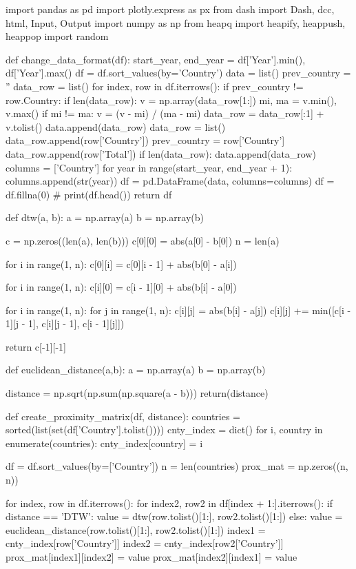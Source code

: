 import pandas as pd
import plotly.express as px
from dash import Dash, dcc, html, Input, Output
import numpy as np
from heapq import heapify, heappush, heappop
import random


def change_data_format(df):
    start_year, end_year = df['Year'].min(), df['Year'].max()
    df = df.sort_values(by='Country')
    data = list()
    prev_country = ''
    data_row = list()
    for index, row in df.iterrows():
        if prev_country != row.Country:
            if len(data_row):
                v = np.array(data_row[1:])
                mi, ma = v.min(), v.max()
                if mi != ma:
                    v = (v - mi) / (ma - mi)
                data_row = data_row[:1] + v.tolist()
                data.append(data_row)
            data_row = list()
            data_row.append(row['Country'])
            prev_country = row['Country']
        data_row.append(row['Total'])
    if len(data_row):
        data.append(data_row)
    columns = ['Country']
    for year in range(start_year, end_year + 1):
        columns.append(str(year))
    df = pd.DataFrame(data, columns=columns)
    df = df.fillna(0)
    # print(df.head())
    return df


def dtw(a, b):
    a = np.array(a)
    b = np.array(b)

    c = np.zeros((len(a), len(b)))
    c[0][0] = abs(a[0] - b[0])
    n = len(a)

    for i in range(1, n):
        c[0][i] = c[0][i - 1] + abs(b[0] - a[i])

    for i in range(1, n):
        c[i][0] = c[i - 1][0] + abs(b[i] - a[0])

    for i in range(1, n):
        for j in range(1, n):
            c[i][j] = abs(b[i] - a[j])
            c[i][j] += min([c[i - 1][j - 1], c[i][j - 1], c[i - 1][j]])

    return c[-1][-1]


def euclidean_distance(a,b):
    a = np.array(a)
    b = np.array(b)

    distance = np.sqrt(np.sum(np.square(a - b)))
    return(distance)


def create_proximity_matrix(df, distance):
    countries = sorted(list(set(df['Country'].tolist())))
    cnty_index = dict()
    for i, country in enumerate(countries):
        cnty_index[country] = i

    df = df.sort_values(by=['Country'])
    n = len(countries)
    prox_mat = np.zeros((n, n))

    for index, row in df.iterrows():
        for index2, row2 in df[index + 1:].iterrows():
            if distance == 'DTW':
                value = dtw(row.tolist()[1:], row2.tolist()[1:])
            else:
                value = euclidean_distance(row.tolist()[1:], row2.tolist()[1:])
            index1 = cnty_index[row['Country']]
            index2 = cnty_index[row2['Country']]
            prox_mat[index1][index2] = value
            prox_mat[index2][index1] = value

